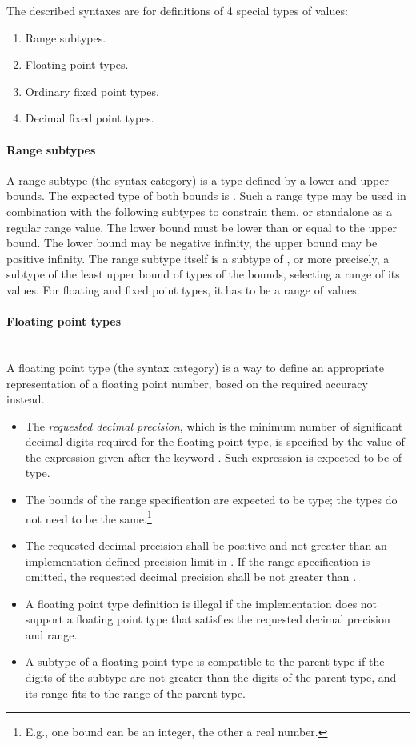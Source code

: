 The described syntaxes are for definitions of 4 special types of values:
\begin{enumerate}
  \item Range subtypes.
  \item Floating point types. 
  \item Ordinary fixed point types. 
  \item Decimal fixed point types. 
\end{enumerate}

\paragraph{Range subtypes}
A range subtype (the  syntax category) is a type defined by a lower and upper bounds. The expected type of both bounds is . Such a range type may be used in combination with the following subtypes to constrain them, or standalone as a regular range value. The lower bound must be lower than or equal to the upper bound. The lower bound may be negative infinity, the upper bound may be positive infinity. The range subtype itself is a subtype of , or more precisely, a subtype of the least upper bound of types of the bounds, selecting a range of its values. For floating and fixed point types, it has to be a range of  values. 

\paragraph{Floating point types} ~\\
A floating point type (the  syntax category) is a way to define an appropriate representation of a floating point number, based on the required accuracy instead. 
\begin{itemize}
  \item[] The {\em requested decimal precision}, which is the minimum number of significant decimal digits required for the floating point type, is specified by the value of the expression given after the keyword . Such expression is expected to be of  type. 
  \item[] The bounds of the range specification are expected to be  type; the types do not need to be the same.\footnote{E.g., one bound can be an integer, the other a real number.}
  \item[] The requested decimal precision shall be positive and not greater than an implementation-defined precision limit in . If the range specification is omitted, the requested decimal precision shall be not greater than . 
  \item[] A floating point type definition is illegal if the implementation does not support a floating point type that satisfies the requested decimal precision and range. 
  \item[] A subtype of a floating point type is compatible to the parent type if the digits of the subtype are not greater than the digits of the parent type, and its range fits to the range of the parent type. 
\end{itemize}

